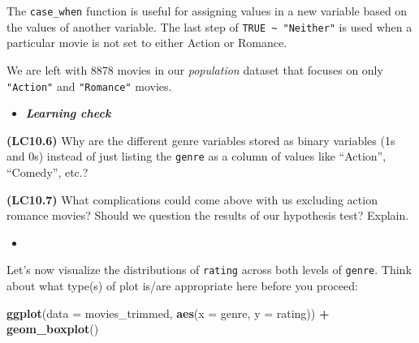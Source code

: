 \documentclass[12pt,]{krantz}
\makeatletter
\newenvironment{Shaded}{\begin{snugshade}}{\end{snugshade}}
\newcommand{\KeywordTok}[1]{\textcolor[rgb]{0.27,0.27,0.27}{\textbf{#1}}}
\newcommand{\DataTypeTok}[1]{\textcolor[rgb]{0.27,0.27,0.27}{#1}}
\newcommand{\DecValTok}[1]{\textcolor[rgb]{0.06,0.06,0.06}{#1}}
\newcommand{\StringTok}[1]{\textcolor[rgb]{0.5,0.5,0.5}{#1}}
\newcommand{\OtherTok}[1]{\textcolor[rgb]{0.37,0.37,0.37}{#1}}
\newcommand{\OperatorTok}[1]{\textcolor[rgb]{0.43,0.43,0.43}{\textbf{#1}}}
\newcommand{\NormalTok}[1]{#1}
\newenvironment{kframe}{%
\medskip{}
\setlength{\fboxsep}{.8em}
 \def\at@end@of@kframe{}%
 \ifinner\ifhmode%
  \def\at@end@of@kframe{\end{minipage}}%
  \begin{minipage}{\columnwidth}%
 \fi\fi%
 \def\FrameCommand##1{\hskip\@totalleftmargin \hskip-\fboxsep
 \colorbox{shadecolor}{##1}\hskip-\fboxsep
     \hskip-\linewidth \hskip-\@totalleftmargin \hskip\columnwidth}%
 \MakeFramed {\advance\hsize-\width
   \@totalleftmargin\z@ \linewidth\hsize
   \@setminipage}}%
 {\par\unskip\endMakeFramed%
 \at@end@of@kframe}
\renewenvironment{Shaded}{\begin{kframe}}{\end{kframe}}
\newenvironment{rmdblock}[1]
  {\begin{shaded*}
  \begin{itemize}
  \renewcommand{\labelitemi}{
    \raisebox{-.7\height}[0pt][0pt]{
    }
  }
  \item
  }
  {
  \end{itemize}
  \end{shaded*}
  }
\newenvironment{learncheck}
  {\begin{rmdblock}{warning}}
  {\end{rmdblock}}
\makeatother
\begin{document}
\begin{Shaded}
\end{Shaded}

The \texttt{case\_when} function is useful for assigning values in a new
variable based on the values of another variable. The last step of
\texttt{TRUE\ \textasciitilde{}\ "Neither"} is used when a particular
movie is not set to either Action or Romance.

We are left with 8878 movies in our \emph{population} dataset that
focuses on only \texttt{"Action"} and \texttt{"Romance"} movies.

\begin{learncheck}
\textbf{\emph{Learning check}}
\end{learncheck}

\textbf{(LC10.6)} Why are the different genre variables stored as binary
variables (1s and 0s) instead of just listing the \texttt{genre} as a
column of values like ``Action'', ``Comedy'', etc.?

\textbf{(LC10.7)} What complications could come above with us excluding
action romance movies? Should we question the results of our hypothesis
test? Explain.

\begin{learncheck}

\end{learncheck}

Let's now visualize the distributions of \texttt{rating} across both
levels of \texttt{genre}. Think about what type(s) of plot is/are
appropriate here before you proceed:

\begin{Shaded}
\begin{Highlighting}[]
\KeywordTok{ggplot}\NormalTok{(}\DataTypeTok{data =}\NormalTok{ movies_trimmed, }\KeywordTok{aes}\NormalTok{(}\DataTypeTok{x =}\NormalTok{ genre, }\DataTypeTok{y =}\NormalTok{ rating)) }\OperatorTok{+}
\StringTok{  }\KeywordTok{geom_boxplot}\NormalTok{()}
\end{Highlighting}
\end{Shaded}
\end{document}
